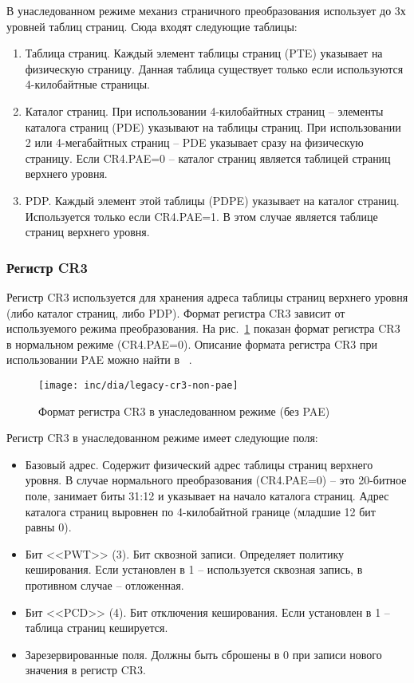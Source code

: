 В унаследованном режиме механиз страничного преобразования использует до 3х уровней таблиц страниц.
Сюда входят следующие таблицы:
\begin{enumerate}[1.]
	\item Таблица страниц. Каждый элемент таблицы страниц (PTE) указывает на физическую страницу. Данная таблица
		существует только если используются 4-килобайтные страницы.
	\item Каталог страниц. При использовании 4-килобайтных страниц -- элементы каталога страниц (PDE)
		указывают на таблицы страниц. При использовании 2 или 4-мегабайтных страниц -- PDE указывает
		сразу на физическую страницу. Если CR4.PAE=0 -- каталог страниц является таблицей страниц верхнего уровня.
	\item PDP. Каждый элемент этой таблицы (PDPE) указывает на каталог страниц.
		Используется только если CR4.PAE=1. В этом случае является таблице страниц верхнего уровня.
\end{enumerate}

\subsubsection*{Регистр CR3}
Регистр CR3 используется для хранения адреса таблицы страниц верхнего уровня (либо каталог страниц,
либо PDP). Формат регистра CR3 зависит от используемого режима преобразования.
На рис.~\ref{fig:legacy-cr3-non-pae} показан формат регистра CR3 в нормальном режиме (CR4.PAE=0).
Описание формата регистра CR3 при использовании PAE можно найти в ~\cite{amd_pm_v2}.

\begin{figure}[ht!]
  \centering
  \texttt{[image: inc/dia/legacy-cr3-non-pae]}
  \caption{Формат регистра CR3 в унаследованном режиме (без PAE)}
  \label{fig:legacy-cr3-non-pae}
\end{figure}

Регистр CR3 в унаследованном режиме имеет следующие поля:
\begin{itemize}
\item Базовый адрес. Содержит физический адрес таблицы страниц верхнего уровня. В случае нормального
	преобразования (CR4.PAE=0) -- это 20-битное поле, занимает биты 31:12 и указывает на начало
	каталога страниц. Адрес каталога страниц выровнен по 4-килобайтной границе (младшие 12 бит равны 0).
\item Бит <<PWT>> (3). Бит сквозной записи. Определяет политику кеширования. Если установлен в 1 --
	используется сквозная запись, в противном случае -- отложенная.
\item Бит <<PCD>> (4). Бит отключения кеширования. Если установлен в 1 -- таблица страниц кешируется.
\item Зарезервированные поля. Должны быть сброшены в 0 при записи нового значения в регистр CR3.
\end{itemize}

